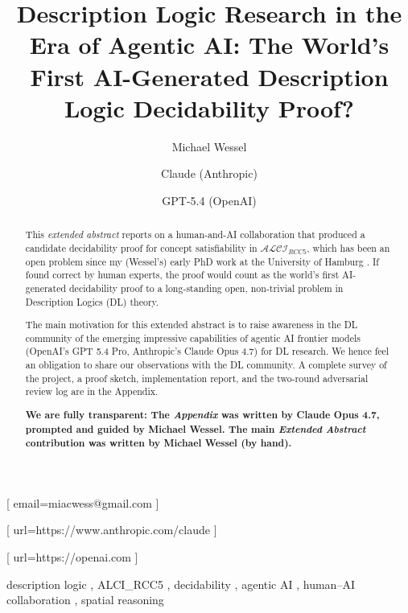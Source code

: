 \documentclass[
]{ceurart}
\theoremstyle{definition}
\newcommand{\ALCIRCC}[1]{\ensuremath{\mathcal{ALCI}_{\mathit{RCC#1}}}}
\begin{document}

\conference{}

\title{Description Logic Research in the Era of Agentic AI: The
  World's First AI-Generated Description Logic Decidability Proof?}

\author[1]{Michael Wessel}[%
email=miacwess@gmail.com
]
\cormark[1]
\address[1]{LambdaMikel@Home}

\author[2]{Claude (Anthropic)}[%
url=https://www.anthropic.com/claude
]
\address[2]{Anthropic, San Francisco, CA, USA}

\author[3]{GPT-5.4 (OpenAI)}[%
url=https://openai.com
]
\address[3]{OpenAI, San Francisco, CA, USA}


\begin{abstract}
This \emph{extended abstract} reports on a human-and-AI collaboration
that produced a candidate decidability proof for concept
satisfiability in $\ALCIRCC{5}$, which has been an open problem since
my (Wessel's) early PhD work at the University of Hamburg
\cite{Wessel2002, Wessel2003}. If found correct by human experts, the
proof would count as the world's first AI-generated decidability proof
to a long-standing open, non-trivial problem in Description Logics
(DL) theory.

The main motivation for this extended abstract is to raise awareness
in the DL community of the emerging impressive capabilities of
agentic AI frontier models (OpenAI's GPT 5.4 Pro, Anthropic's Claude Opus
4.7) for DL research. We hence feel an obligation to share our
observations with the DL community. A complete survey of the project,
a proof sketch, implementation report, and the two-round adversarial
review log are in the Appendix.

\textbf{We are fully transparent: The \emph{Appendix} was written by Claude
Opus 4.7, prompted and guided by Michael Wessel. The main
\emph{Extended Abstract} contribution was written by Michael Wessel
(by hand).}
\end{abstract}

\begin{keywords}
  description logic \sep
  ALCI\_RCC5 \sep
  decidability \sep
  agentic AI \sep
  human--AI collaboration \sep
  spatial reasoning
\end{keywords}
\end{document}
